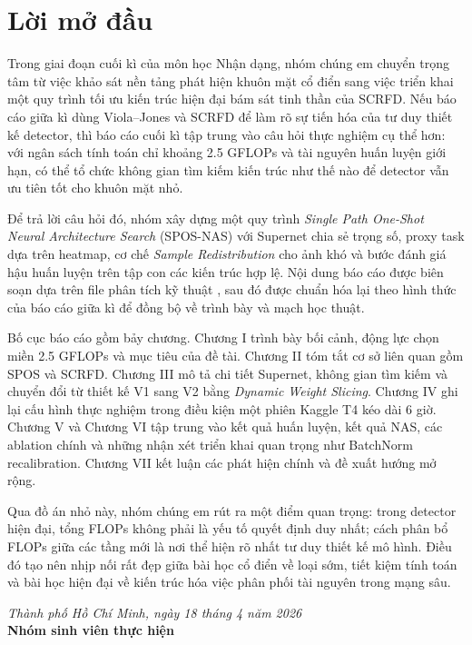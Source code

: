 \chapter*{Lời mở đầu}

Trong giai đoạn cuối kì của môn học Nhận dạng, nhóm chúng em chuyển trọng tâm từ việc khảo sát nền tảng phát hiện khuôn mặt cổ điển sang việc triển khai một quy trình tối ưu kiến trúc hiện đại bám sát tinh thần của SCRFD. Nếu báo cáo giữa kì dùng Viola--Jones và SCRFD để làm rõ sự tiến hóa của tư duy thiết kế detector, thì báo cáo cuối kì tập trung vào câu hỏi thực nghiệm cụ thể hơn: với ngân sách tính toán chỉ khoảng 2.5 GFLOPs và tài nguyên huấn luyện giới hạn, có thể tổ chức không gian tìm kiếm kiến trúc như thế nào để detector vẫn ưu tiên tốt cho khuôn mặt nhỏ.

Để trả lời câu hỏi đó, nhóm xây dựng một quy trình \textit{Single Path One-Shot Neural Architecture Search} (SPOS-NAS) với Supernet chia sẻ trọng số, proxy task dựa trên heatmap, cơ chế \textit{Sample Redistribution} cho ảnh khó và bước đánh giá hậu huấn luyện trên tập con các kiến trúc hợp lệ. Nội dung báo cáo được biên soạn dựa trên file phân tích kỹ thuật , sau đó được chuẩn hóa lại theo hình thức của báo cáo giữa kì để đồng bộ về trình bày và mạch học thuật.

Bố cục báo cáo gồm bảy chương. Chương I trình bày bối cảnh, động lực chọn miền 2.5 GFLOPs và mục tiêu của đề tài. Chương II tóm tắt cơ sở liên quan gồm SPOS và SCRFD. Chương III mô tả chi tiết Supernet, không gian tìm kiếm và chuyển đổi từ thiết kế V1 sang V2 bằng \textit{Dynamic Weight Slicing}. Chương IV ghi lại cấu hình thực nghiệm trong điều kiện một phiên Kaggle T4 kéo dài 6 giờ. Chương V và Chương VI tập trung vào kết quả huấn luyện, kết quả NAS, các ablation chính và những nhận xét triển khai quan trọng như BatchNorm recalibration. Chương VII kết luận các phát hiện chính và đề xuất hướng mở rộng.

Qua đồ án nhỏ này, nhóm chúng em rút ra một điểm quan trọng: trong detector hiện đại, tổng FLOPs không phải là yếu tố quyết định duy nhất; cách phân bổ FLOPs giữa các tầng mới là nơi thể hiện rõ nhất tư duy thiết kế mô hình. Điều đó tạo nên nhịp nối rất đẹp giữa bài học cổ điển về loại sớm, tiết kiệm tính toán và bài học hiện đại về kiến trúc hóa việc phân phối tài nguyên trong mạng sâu.

\vspace{1.5cm}
\begin{flushright}
\textit{Thành phố Hồ Chí Minh, ngày 18 tháng 4 năm 2026}\\[0.5cm]
\textbf{Nhóm sinh viên thực hiện}
\end{flushright}
